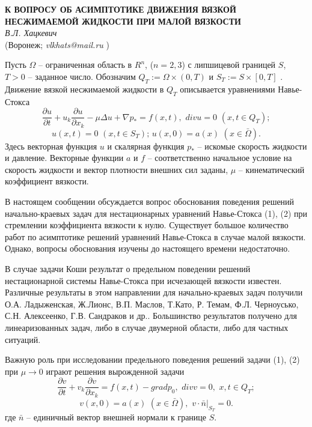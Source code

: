

\begin{center}{ \bf  К ВОПРОСУ ОБ АСИМПТОТИКЕ ДВИЖЕНИЯ ВЯЗКОЙ НЕСЖИМАЕМОЙ ЖИДКОСТИ ПРИ МАЛОЙ ВЯЗКОСТИ}\\
{\it В.Л. Хацкевич } \\
(Воронеж; {\it vlkhats@mail.ru} )
\end{center}
Пусть  $\Omega$ – ограниченная область в $R^n$, ($n=2, 3$) с липшицевой границей  $S$, $T>0$  -- заданное число. Обозначим $Q_T:=\Omega\times (0, T)$  и $S_T:= S\times [0, T]$ . Движение вязкой несжимаемой жидкости в  $Q_T$ описывается уравнениями Навье-Стокса
\begin{equation}
\frac{\partial u}{\partial t} + u_k\frac{\partial u}{\partial x_k} - \mu\Delta u + \nabla p_{*} = f(x, t),\,\, div u = 0\,\,(x, t\in Q_T);
\end{equation}
\begin{equation}
u(x,t) = 0 \,\,(x,t\in S_T);\,u(x, 0) = a(x)\,\,(x\in\bar{\Omega}).
\end{equation}
Здесь векторная функция  $u$ и скалярная функция $p_{*}$ -- искомые скорость жидкости и давление. Векторные функции  $a$ и  $f$  -- соответственно начальное условие на скорость жидкости и вектор плотности внешних сил заданы,   $\mu$ -- кинематический коэффициент вязкости.

В настоящем сообщении обсуждается вопрос обоснования поведения решений начально-краевых задач для нестационарных уравнений Навье-Стокса (1), (2) при стремлении коэффициента вязкости к нулю. Существует большое количество работ по асимптотике решений уравнений Навье-Стокса в случае малой вязкости. Однако, вопросы обоснования изучены до настоящего времени недостаточно.

В случае задачи Коши результат о предельном поведении решений нестационарной системы Навье-Стокса при исчезающей вязкости известен. Различные результаты в этом направлении для начально-краевых задач получили О.А. Ладыженская, Ж.Лионс, В.П. Маслов, Т.Като, Р. Темам, Ф.Л. Черноусько, С.Н. Алексеенко, Г.В. Сандраков и др.. Большинство результатов получено для линеаризованных задач, либо в случае двумерной области, либо для частных ситуаций.

Важную роль при исследовании предельного поведения решений задачи (1), (2) при  $\mu\rightarrow 0$ играют решения вырожденной задачи
\begin{equation}
\frac{\partial v}{\partial t} + v_k\frac{\partial v}{\partial x_k} = f(x,t) - grad p_0,\,\,div v = 0,\,\, x, t\in Q_T;
\end{equation}
\begin{equation}
v(x,0) = a(x) \,\,(x\in\bar{\Omega}),\,\,v\cdot\bar{n}|_{S_T}=0.
\end{equation}
где $\bar{n}$ -- единичный вектор внешней нормали к границе  $S$.

